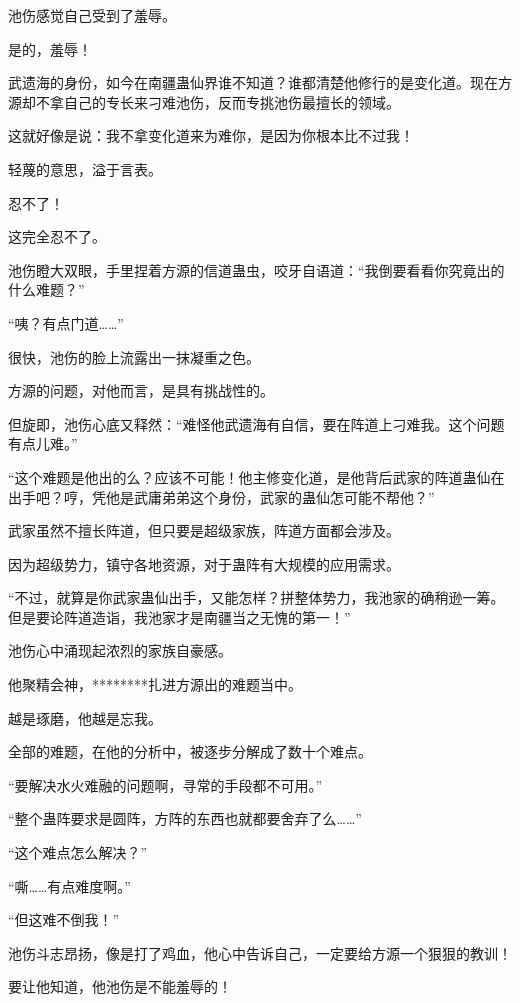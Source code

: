 
\begin{this_body}

池伤感觉自己受到了羞辱。

是的，羞辱！

武遗海的身份，如今在南疆蛊仙界谁不知道？谁都清楚他修行的是变化道。现在方源却不拿自己的专长来刁难池伤，反而专挑池伤最擅长的领域。

这就好像是说：我不拿变化道来为难你，是因为你根本比不过我！

轻蔑的意思，溢于言表。

忍不了！

这完全忍不了。

池伤瞪大双眼，手里捏着方源的信道蛊虫，咬牙自语道：“我倒要看看你究竟出的什么难题？”

“咦？有点门道……”

很快，池伤的脸上流露出一抹凝重之色。

方源的问题，对他而言，是具有挑战性的。

但旋即，池伤心底又释然：“难怪他武遗海有自信，要在阵道上刁难我。这个问题有点儿难。”

“这个难题是他出的么？应该不可能！他主修变化道，是他背后武家的阵道蛊仙在出手吧？哼，凭他是武庸弟弟这个身份，武家的蛊仙怎可能不帮他？”

武家虽然不擅长阵道，但只要是超级家族，阵道方面都会涉及。

因为超级势力，镇守各地资源，对于蛊阵有大规模的应用需求。

“不过，就算是你武家蛊仙出手，又能怎样？拼整体势力，我池家的确稍逊一筹。但是要论阵道造诣，我池家才是南疆当之无愧的第一！”

池伤心中涌现起浓烈的家族自豪感。

他聚精会神，********扎进方源出的难题当中。

越是琢磨，他越是忘我。

全部的难题，在他的分析中，被逐步分解成了数十个难点。

“要解决水火难融的问题啊，寻常的手段都不可用。”

“整个蛊阵要求是圆阵，方阵的东西也就都要舍弃了么……”

“这个难点怎么解决？”

“嘶……有点难度啊。”

“但这难不倒我！”

池伤斗志昂扬，像是打了鸡血，他心中告诉自己，一定要给方源一个狠狠的教训！

要让他知道，他池伤是不能羞辱的！


\end{this_body}
